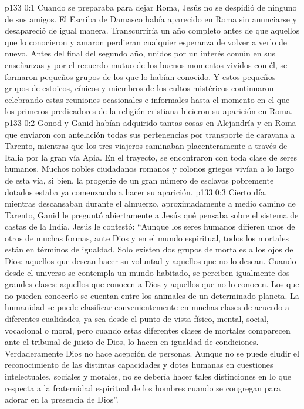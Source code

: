 \author{Comisión de seres intermedios}
\vs p133 0:1 Cuando se preparaba para dejar Roma, Jesús no se despidió de ninguno de sus amigos. El Escriba de Damasco había aparecido en Roma sin anunciarse y desapareció de igual manera. Transcurriría un año completo antes de que aquellos que lo conocieron y amaron perdieran cualquier esperanza de volver a verlo de nuevo. Antes del final del segundo año, unidos por un interés común en sus enseñanzas y por el recuerdo mutuo de los buenos momentos vividos con él, se formaron pequeños grupos de los que lo habían conocido. Y estos pequeños grupos de estoicos, cínicos y miembros de los cultos mistéricos continuaron celebrando estas reuniones ocasionales e informales hasta el momento en el que los primeros predicadores de la religión cristiana hicieron su aparición en Roma.
\vs p133 0:2 \pc Gonod y Ganid habían adquirido tantas cosas en Alejandría y en Roma que enviaron con antelación todas sus pertenencias por transporte de caravana a Tarento, mientras que los tres viajeros caminaban placenteramente a través de Italia por la gran vía Apia. En el trayecto, se encontraron con toda clase de seres humanos. Muchos nobles ciudadanos romanos y colonos griegos vivían a lo largo de esta vía, si bien, la progenie de un gran número de esclavos pobremente dotados estaba ya comenzando a hacer su aparición.
\vs p133 0:3 Cierto día, mientras descansaban durante el almuerzo, aproximadamente a medio camino de Tarento, Ganid le preguntó abiertamente a Jesús qué pensaba sobre el sistema de castas de la India. Jesús le contestó: “Aunque los seres humanos difieren unos de otros de muchas formas, ante Dios y en el mundo espiritual, todos los mortales están en términos de igualdad. Solo existen dos grupos de mortales a los ojos de Dios: aquellos que desean hacer su voluntad y aquellos que no lo desean. Cuando desde el universo se contempla un mundo habitado, se perciben igualmente dos grandes clases: aquellos que conocen a Dios y aquellos que no lo conocen. Los que no pueden conocerlo se cuentan entre los animales de un determinado planeta. La humanidad se puede clasificar convenientemente en muchas clases de acuerdo a diferentes cualidades, ya sea desde el punto de vista físico, mental, social, vocacional o moral, pero cuando estas diferentes clases de mortales comparecen ante el tribunal de juicio de Dios, lo hacen en igualdad de condiciones. Verdaderamente Dios no hace acepción de personas. Aunque no se puede eludir el reconocimiento de las distintas capacidades y dotes humanas en cuestiones intelectuales, sociales y morales, no se debería hacer tales distinciones en lo que respecta a la fraternidad espiritual de los hombres cuando se congregan para adorar en la presencia de Dios”.
